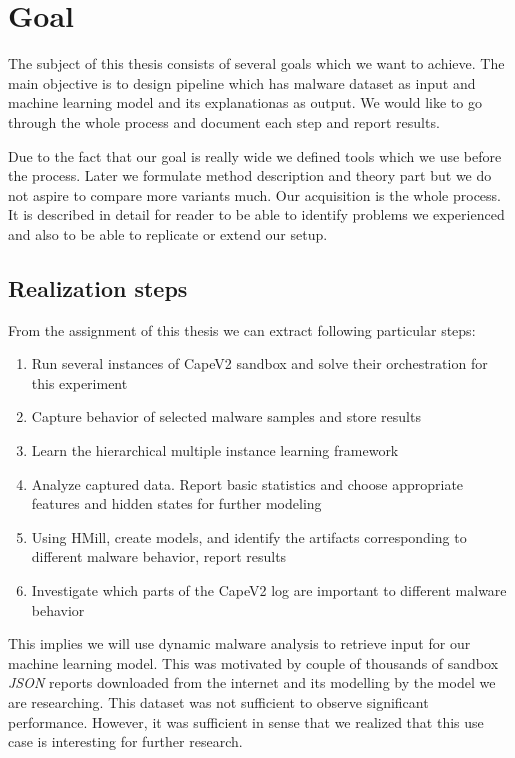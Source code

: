 \section{Goal}
The subject of this thesis consists of several goals which we want to achieve. The main objective is to design pipeline which has malware dataset as input and machine learning model and its explanationas as output. We would like to go through the whole process and document each step and report results.

Due to the fact that our goal is really wide we defined tools which we use before the process. Later we formulate method description and theory part but we do not aspire to compare more variants much. Our acquisition is the whole process. It is described in detail for reader to be able to identify problems we experienced and also to be able to replicate or extend our setup.

\subsection{Realization steps}
From the assignment of this thesis we can extract following particular steps:
\begin{enumerate}
    \item Run several instances of CapeV2 \cite{Cape} sandbox and solve their orchestration for this experiment
    \item Capture behavior of selected malware samples and store results
    \item Learn the hierarchical multiple instance learning framework
    \item Analyze captured data. Report basic statistics and choose appropriate features and hidden states for further modeling
    \item Using HMill, create models, and identify the artifacts corresponding to different malware behavior, report results
    \item Investigate which parts of the CapeV2 log are important to different malware behavior
\end{enumerate}

This implies we will use dynamic malware analysis to retrieve input for our machine learning model. This was motivated by couple of thousands of sandbox \emph{JSON} reports downloaded from the internet and its modelling by the model we are researching. This dataset was not sufficient to observe significant performance. However, it was sufficient in sense that we realized that this use case is interesting for further research.

